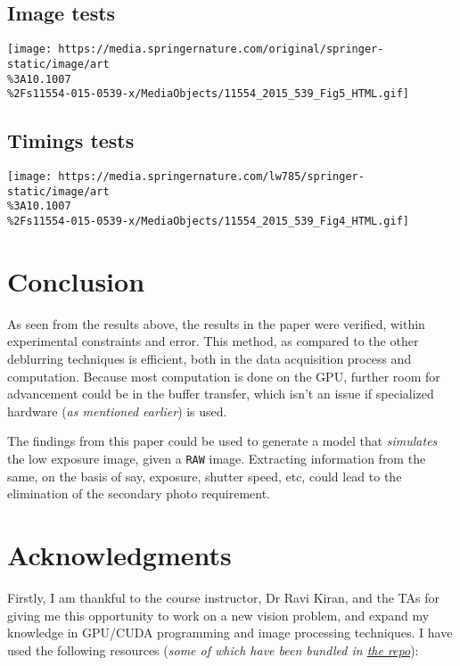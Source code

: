 \hypertarget{image-tests}{%
\subsection{Image tests}\label{image-tests}}

\texttt{[image: https://media.springernature.com/original/springer-static/image/art\\\%3A10.1007\\\%2Fs11554-015-0539-x/MediaObjects/11554\_2015\_539\_Fig5\_HTML.gif]}

\hypertarget{timings-tests}{%
\subsection{Timings tests}\label{timings-tests}}

\texttt{[image: https://media.springernature.com/lw785/springer-static/image/art\\\%3A10.1007\\\%2Fs11554-015-0539-x/MediaObjects/11554\_2015\_539\_Fig4\_HTML.gif]}

\hypertarget{conclusion}{%
\section{Conclusion}\label{conclusion}}

As seen from the results above, the results in the paper were verified,
within experimental constraints and error. This method, as compared to
the other deblurring techniques is efficient, both in the data
acquisition process and computation. Because most computation is done on
the GPU, further room for advancement could be in the buffer transfer,
which isn't an issue if specialized hardware (\emph{as mentioned
earlier}) is used.

The findings from this paper could be used to generate a model that
\emph{simulates} the low exposure image, given a \texttt{RAW} image.
Extracting information from the same, on the basis of say, exposure,
shutter speed, etc, could lead to the elimination of the secondary photo
requirement.

\hypertarget{acknowledgments}{%
\section{Acknowledgments}\label{acknowledgments}}

Firstly, I am thankful to the course instructor, Dr Ravi Kiran, and the
TAs for giving me this opportunity to work on a new vision problem, and
expand my knowledge in GPU/CUDA programming and image processing
techniques. I have used the following resources (\emph{some of which
have been bundled in
\href{https://github.com/Pk13055/low-rank-image-deblurring}{the repo}}):

